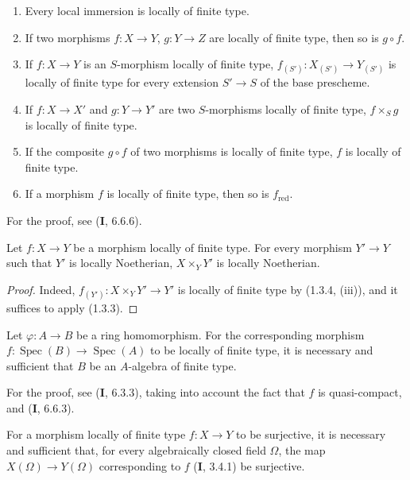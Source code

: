 \begin{proposition}[1.3.4]
\label{IV.1.3.4}
\begin{enumerate}
  \item[\textup{(i)}] Every local immersion is locally of finite type.
  \item[\textup{(ii)}] If two morphisms $f:X\to Y$, $g:Y\to Z$ are locally of
  finite type, then so is $g\circ f$.
  \item[\textup{(iii)}] If $f:X\to Y$ is an $S$-morphism locally of finite type,
  $f_{(S')}:X_{(S')}\to Y_{(S')}$ is locally of finite type for every
  extension $S'\to S$ of the base prescheme.
  \item[\textup{(iv)}] If $f:X\to X'$ and $g:Y\to Y'$ are two $S$-morphisms
  locally of finite type, $f\times_Sg$ is locally of finite type.
  \item[\textup{(v)}] If the composite $g\circ f$ of two morphisms is locally of
  finite type, $f$ is locally of finite type.
  \item[\textup{(vi)}] If a morphism $f$ is locally of finite type, then so is
  $f_{\mathrm{red}}$.
\end{enumerate}
\end{proposition}

For the proof, see (\textbf{I}, 6.6.6).

\begin{corollary}[1.3.5]
\label{IV.1.3.5}
Let $f:X\to Y$ be a morphism locally of finite type. For every morphism
$Y'\to Y$ such that $Y'$ is locally Noetherian, $X\times_YY'$ is
locally Noetherian.
\end{corollary}

\begin{proof}
Indeed, $f_{(Y')}:X\times_YY'\to Y'$ is locally of finite type by
(1.3.4, (iii)), and it suffices to apply (1.3.3).
\end{proof}

\begin{proposition}[1.3.6]
\label{IV.1.3.6}
Let $\varphi:A\to B$ be a ring homomorphism. For the corresponding
morphism $f:\operatorname{Spec}(B)\to\operatorname{Spec}(A)$ to be locally of finite type, it is necessary and
sufficient that $B$ be an $A$-algebra of finite type.
\end{proposition}

For the proof, see (\textbf{I}, 6.3.3), taking into account the fact that $f$ is
quasi-compact, and (\textbf{I}, 6.6.3).

\begin{proposition}[1.3.7]
\label{IV.1.3.7}
For a morphism locally of finite type $f:X\to Y$ to be surjective, it is
necessary and sufficient that, for every algebraically closed field $\Omega$,
the map $X(\Omega)\to Y(\Omega)$ corresponding to $f$ \textup{(\textbf{I}, 3.4.1)} be
surjective.
\end{proposition}

